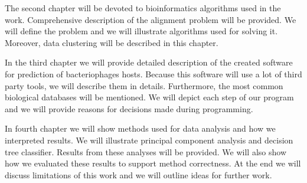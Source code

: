 The second chapter will be devoted to bioinformatics algorithms used in the work.
Comprehensive description of the alignment problem will be provided.
We will define the problem and we will illustrate algorithms used for solving it.
Moreover, data clustering will be described in this chapter.

In the third chapter we will provide detailed description of the created software for prediction of bacteriophages hosts.
Because this software will use a lot of third party tools, we will describe them in details. 
Furthermore, the most common biological databases will be mentioned.
We will depict each step of our program and we will provide reasons for decisions made during programming. 

In fourth chapter we will show methods used for data analysis and how we interpreted results.
We will illustrate principal component analysis and decision tree classifier.
Results from these analyses will be provided.
We will also show how we evaluated these results to support method correctness.
At the end we will discuss limitations of this work and we will outline ideas for further work.
